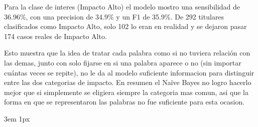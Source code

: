 \documentclass{Academic}
\begin{document}
Para la clase de interes (Impacto Alto) el modelo mostro una sensibilidad de 36.96\%, con una precision de 34.9\% y
un F1 de 35.9\%. De 292 titulares clasificados como Impacto Alto, solo 102 lo eran en realidad y se dejaron pasar 174
casos reales de Impacto Alto.

Esto muestra que la idea de tratar cada palabra como si no tuviera relación con las demas, junto con solo fijarse en
si una palabra aparece o no (sin importar cuántas veces se repite), no le da al modelo suficiente informacion para 
distinguir entre las dos categorias de impacto. En resumen el Naïve Bayes no logro hacerlo mejor que si simplemente
se eligiera siempre la categoria mas comun, asi que la forma en que se representaron las palabras no fue suficiente para
esta ocasion.

\singlespacing
\emergencystretch 3em
\hfuzz 1px
\printbibliography[heading=bibnumbered]




\end{document}
